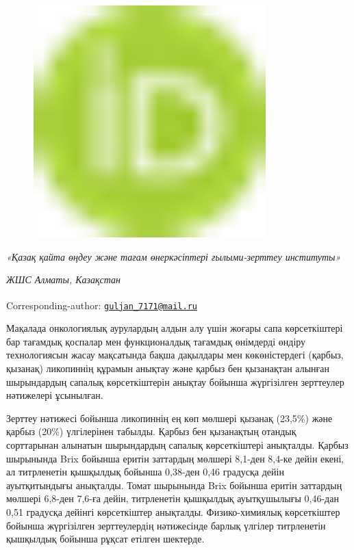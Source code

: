 \begin{figure}[H]
	\centering
	\includegraphics[width=0.8\textwidth]{media/pish2/image1}
	\caption*{}
\end{figure}


\emph{«Қазақ қайта өңдеу және тағам өнеркәсіптері ғылыми-зерттеу
институты»}

\emph{ЖШС Алматы, Казақстан}

{\bfseries \textsuperscript{\envelope }}Corresponding-author:
\href{mailto:guljan_7171@mail.ru}{\nolinkurl{guljan\_7171@mail.ru}}

Мақалада онкологиялық аурулардың алдын алу үшін жоғары сапа
көрсеткіштері бар тағамдық қоспалар мен функционалдық тағамдық өнімдерді
өндіру технологиясын жасау мақсатында бақша дақылдары мен көкөністердегі
(қарбыз, қызанақ) ликопиннің құрамын анықтау және қарбыз бен қызанақтан
алынған шырындардың сапалық көрсеткіштерін анықтау бойынша жүргізілген
зерттеулер нәтижелері ұсынылған.

Зерттеу нәтижесі бойынша ликопиннің ең көп мөлшері қызанақ (23,5\%) және
қарбыз (20\%) үлгілерінен табылды. Қарбыз бен қызанақтың отандық
сорттарынан алынатын шырындардың сапалық көрсеткіштері анықталды. Қарбыз
шырынында Brix бойынша еритін заттардың мөлшері 8,1-ден 8,4-ке дейін
екені, ал титрленетін қышқылдық бойынша 0,38-ден 0,46 градусқа дейін
ауытқитындығы анықталды. Томат шырынында Brix бойынша еритін заттардың
мөлшері 6,8-ден 7,6-ға дейін, титрленетін қышқылдық ауытқушылығы
0,46-дан 0,51 градусқа дейінгі көрсеткіштер анықталды. Физико-химиялық
көрсеткіштер бойынша жүргізілген зерттеулердің нәтижесінде барлық
үлгілер титрленетін қышқылдық бойынша рұқсат етілген шектерде.

